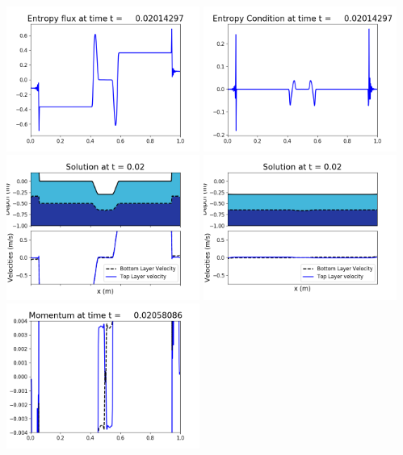 \documentclass[11pt]{article}
\begin{document}
\includegraphics[width=0.475\textwidth]{frame0047fig1008.png}
\vskip 10pt 
\includegraphics[width=0.475\textwidth]{frame0047fig1009.png}
\vskip 10pt 
\includegraphics[width=0.475\textwidth]{frame0048fig1001.png}
\includegraphics[width=0.475\textwidth]{frame0048fig1002.png}
\vskip 10pt 
\includegraphics[width=0.475\textwidth]{frame0048fig1003.png}
\end{document}
